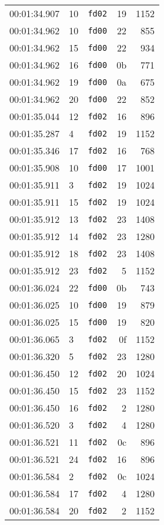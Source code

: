 \documentclass{article}
\begin{document}
\begin{longtable}{lllrr}
00:01:34.907 & 10 & \texttt{fd02} & 19 & 1152 \\
00:01:34.962 & 10 & \texttt{fd00} & 22 & 855 \\
00:01:34.962 & 15 & \texttt{fd00} & 22 & 934 \\
00:01:34.962 & 16 & \texttt{fd00} & 0b & 771 \\
00:01:34.962 & 19 & \texttt{fd00} & 0a & 675 \\
00:01:34.962 & 20 & \texttt{fd00} & 22 & 852 \\
00:01:35.044 & 12 & \texttt{fd02} & 16 & 896 \\
00:01:35.287 & 4 & \texttt{fd02} & 19 & 1152 \\
00:01:35.346 & 17 & \texttt{fd02} & 16 & 768 \\
00:01:35.908 & 10 & \texttt{fd00} & 17 & 1001 \\
00:01:35.911 & 3 & \texttt{fd02} & 19 & 1024 \\
00:01:35.911 & 15 & \texttt{fd02} & 19 & 1024 \\
00:01:35.912 & 13 & \texttt{fd02} & 23 & 1408 \\
00:01:35.912 & 14 & \texttt{fd02} & 23 & 1280 \\
00:01:35.912 & 18 & \texttt{fd02} & 23 & 1408 \\
00:01:35.912 & 23 & \texttt{fd02} & 5 & 1152 \\
00:01:36.024 & 22 & \texttt{fd00} & 0b & 743 \\
00:01:36.025 & 10 & \texttt{fd00} & 19 & 879 \\
00:01:36.025 & 15 & \texttt{fd00} & 19 & 820 \\
00:01:36.065 & 3 & \texttt{fd02} & 0f & 1152 \\
00:01:36.320 & 5 & \texttt{fd02} & 23 & 1280 \\
00:01:36.450 & 12 & \texttt{fd02} & 20 & 1024 \\
00:01:36.450 & 15 & \texttt{fd02} & 23 & 1152 \\
00:01:36.450 & 16 & \texttt{fd02} & 2 & 1280 \\
00:01:36.520 & 3 & \texttt{fd02} & 4 & 1280 \\
00:01:36.521 & 11 & \texttt{fd02} & 0c & 896 \\
00:01:36.521 & 24 & \texttt{fd02} & 16 & 896 \\
00:01:36.584 & 2 & \texttt{fd02} & 0c & 1024 \\
00:01:36.584 & 17 & \texttt{fd02} & 4 & 1280 \\
00:01:36.584 & 20 & \texttt{fd02} & 2 & 1152 \\

\end{longtable}
\end{document}
